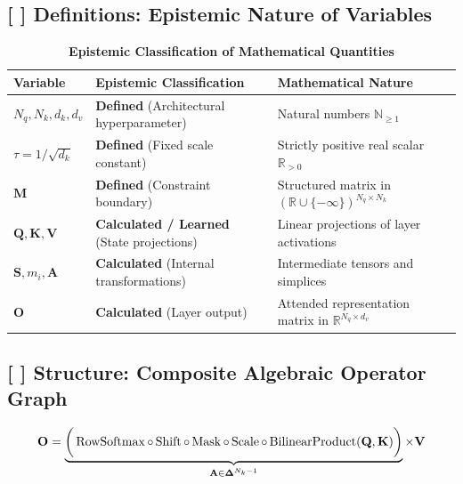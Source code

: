 \documentclass[11pt,a4paper]{article}
\theoremstyle{definition}
\begin{document}
\subsection{[ ] Definitions: Epistemic Nature of Variables}
\begin{table}[h]
\centering
\caption{\textbf{Epistemic Classification of Mathematical Quantities}}
\begin{tabular}{lll}
\toprule
\textbf{Variable} & \textbf{Epistemic Classification} & \textbf{Mathematical Nature} \\
\midrule
$N_q, N_k, d_k, d_v$ & \textbf{Defined} (Architectural hyperparameter) & Natural numbers $\mathbb{N}_{\ge 1}$ \\
$\tau = 1/\sqrt{d_k}$ & \textbf{Defined} (Fixed scale constant) & Strictly positive real scalar $\mathbb{R}_{> 0}$ \\
$\mathbf{M}$ & \textbf{Defined} (Constraint boundary) & Structured matrix in $(\mathbb{R} \cup \{-\infty\})^{N_q \times N_k}$ \\
$\mathbf{Q}, \mathbf{K}, \mathbf{V}$ & \textbf{Calculated / Learned} (State projections) & Linear projections of layer activations \\
$\mathbf{S}, m_i, \mathbf{A}$ & \textbf{Calculated} (Internal transformations) & Intermediate tensors and simplices \\
$\mathbf{O}$ & \textbf{Calculated} (Layer output) & Attended representation matrix in $\mathbb{R}^{N_q \times d_v}$ \\
\bottomrule
\end{tabular}
\end{table}

\subsection{[ ] Structure: Composite Algebraic Operator Graph}
{\boldmath
\begin{equation}
\mathbf{O} = \underbrace{\left( \vphantom{\frac{1}{2}} \operatorname{RowSoftmax} \circ \operatorname{Shift} \circ \operatorname{Mask} \circ \operatorname{Scale} \circ \operatorname{BilinearProduct}(\mathbf{Q}, \mathbf{K}) \right)}_{\mathbf{A} \in \boldsymbol{\Delta}^{N_k - 1}} \times \mathbf{V}
\end{equation}
}
\end{document}
